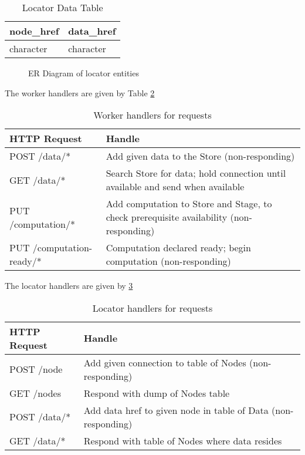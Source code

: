 \begin{table}[]
\caption{Locator Data Table}
\label{tbl:ldata}
\begin{tabular}{@{}ll@{}}
\toprule
node\_href & data\_href \\ \midrule
character  & character  \\ \bottomrule
\end{tabular}
\end{table}

\begin{figure}

\caption{ER Diagram of locator entities}
\label{fig:locatordb}
\end{figure}

The worker handlers are given by Table \ref{tbl:whandler}

\begin{table}[]
\caption{Worker handlers for requests}
\label{tbl:whandler}
\begin{tabular}{@{}ll@{}}
\toprule
HTTP Request             & Handle                                                                         \\ \midrule
POST /data/*             & Add given data to the Store (non-responding)                                   \\
GET /data/*              & Search Store for data; hold connection until available and send when available \\
PUT /computation/* & Add computation to Store and Stage, to check prerequisite availability (non-responding) \\
PUT /computation-ready/* & Computation declared ready; begin computation (non-responding)                 \\ \bottomrule
\end{tabular}
\end{table}

The locator handlers are given by \ref{tbl:lhandler}

\begin{table}[]
\caption{Locator handlers for requests}
\label{tbl:lhandler}
\begin{tabular}{@{}ll@{}}
\toprule
HTTP Request & Handle                                                        \\ \midrule
POST /node   & Add given connection to table of Nodes (non-responding)       \\
GET /nodes   & Respond with dump of Nodes table                              \\
POST /data/* & Add data href to given node in table of Data (non-responding) \\
GET /data/*  & Respond with table of Nodes where data resides                \\ \bottomrule
\end{tabular}
\end{table}

